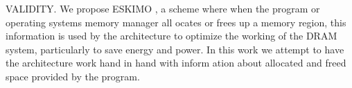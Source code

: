 VALIDITY.
We propose ESKIMO , a scheme where when the program or operating systems memory manager all ocates or
frees up a memory region, this information is used by the architecture to optimize the working of the DRAM system, particularly to save energy and power. In this work we attempt to have the architecture work hand in hand with inform ation about allocated and freed space provided by the program. 